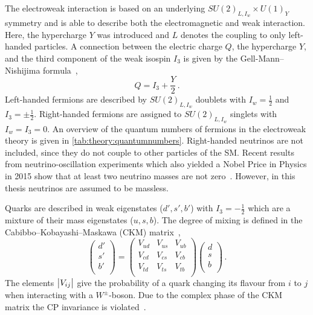 The electroweak interaction is based on an underlying $SU{(2)}_{L,I_w} \times U{(1)}_Y$ symmetry
and is able to describe both the electromagnetic and weak interaction.
Here, the hypercharge $Y$ was introduced and $L$ denotes the coupling to only left-handed particles.
A connection between the electric charge $Q$, the hypercharge $Y$, and the third component of the weak isospin $I_3$
is given by the Gell-Mann--Nishijima formula~\cite{Nishijima1955,GellMann1956},
\begin{equation}
    Q = I_3 + \frac{Y}{2} \,.
\end{equation}
Left-handed fermions are described by $SU{(2)}_{L,I_w}$ doublets with $I_w = \frac{1}{2}$ and $I_3 = \pm \frac{1}{2}$.
Right-handed fermions are assigned to $SU{(2)}_{L,I_w}$ singlets with $I_w = I_3 = 0$.
An overview of the quantum numbers of fermions in the electroweak theory is given in \cref{tab:theory:quantumnumbers}.
Right-handed neutrinos are not included, since they do not couple to other particles of the SM\@.
Recent results from neutrino-oscillation experiments which also yielded a Nobel Price in Physics in 2015 show that at
least two neutrino masses are not zero~\cite{NeutrinoOsc1,NeutrinoOsc2,NeutrinoOsc3,NeutrinoOsc4,NeutrinoOsc5,NeutrinoOsc6}.
However, in this thesis neutrinos are assumed to be massless.

Quarks are described in weak eigenstates ($d',s',b'$) with $I_3 = -\frac{1}{2}$ which are a mixture of their mass eigenstates ($u, s, b$).
The degree of mixing is defined in the Cabibbo--Kobayashi--Maskawa (CKM) matrix~\cite{CKM:KM,CKM:C},
\begin{equation}
    \begin{pmatrix}
        d' \\ s' \\ b' \\
    \end{pmatrix}
    =
    \begin{pmatrix}
        V_{ud} & V_{us} & V_{ub} \\
        V_{cd} & V_{cs} & V_{cb} \\
        V_{td} & V_{ts} & V_{tb} \\
    \end{pmatrix}
    \begin{pmatrix}
        d \\ s \\ b \\
    \end{pmatrix} \,.
\end{equation}
The elements $\left|V_{ij}\right|$ give the probability of a quark changing its flavour from $i$ to $j$ when interacting with a $W^\pm$-boson.
Due to the complex phase of the CKM matrix the CP invariance is violated~\cite{PhysRevLett.13.138}.


